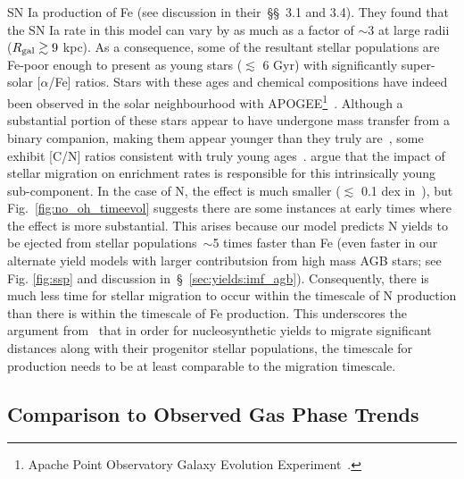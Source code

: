 \documentclass[ms.tex]{subfiles}
\begin{document}
SN Ia production of Fe (see discussion in their~\S\S~3.1 and 3.4).
They found that the SN Ia rate in this model can vary by as much as a factor of
$\sim$3 at large radii ($R_\text{gal} \gtrsim 9$ kpc).
As a consequence, some of the resultant stellar populations are Fe-poor enough
to present as young stars ($\lesssim$ 6 Gyr) with significantly super-solar
[$\alpha$/Fe] ratios.
Stars with these ages and chemical compositions have indeed been observed in
the solar neighbourhood with APOGEE\footnote{
	Apache Point Observatory Galaxy Evolution Experiment~\citep{Majewski2017}.
}~\citep{Chiappini2015, Martig2015, Martig2016, Warfield2021}.
Although a substantial portion of these stars appear to have undergone mass
transfer from a binary companion, making them appear younger than they truly
are~\citep{Jofre2016, Yong2016, Izzard2018, SilvaAguirre2018, Miglio2021}, some
exhibit [C/N] ratios consistent with truly young ages~\citep{Hekker2019}.
\citet{Johnson2021} argue that the impact of stellar migration on enrichment
rates is responsible for this intrinsically young sub-component.
In the case of N, the effect is much smaller ($\lesssim$ 0.1 dex in~\no),
but Fig.~\ref{fig:no_oh_timeevol} suggests there are some instances at early
times where the effect is more substantial.
This arises because our model predicts N yields to be ejected from stellar
populations~$\sim$5 times faster than Fe (even faster in our alternate yield
models with larger contributsion from high mass AGB stars; see Fig.
\ref{fig:ssp} and discussion in~\S~\ref{sec:yields:imf_agb}).
Consequently, there is much less time for stellar migration to occur within the
timescale of N production than there is within the timescale of Fe production.
This underscores the argument from~\citet{Johnson2021} that in order for
nucleosynthetic yields to migrate significant distances along with their
progenitor stellar populations, the timescale for production needs to be at
least comparable to the migration timescale.

\subsection{Comparison to Observed Gas Phase Trends}
\label{sec:results:yields}
\end{document}
